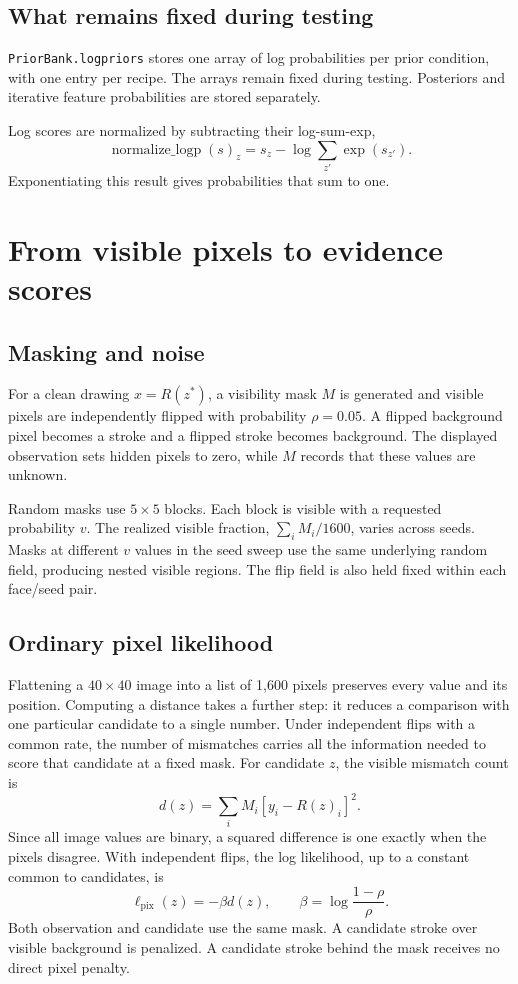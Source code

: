 \documentclass[11pt,letterpaper]{article}
\begin{document}
\subsection{What remains fixed during testing}
\texttt{PriorBank.logpriors} stores one array of log probabilities per prior condition, with one entry per recipe. The arrays remain fixed during testing. Posteriors and iterative feature probabilities are stored separately.

Log scores are normalized by subtracting their log-sum-exp,
\begin{equation}
\operatorname{normalize\_logp}(s)_z
=s_z-\log\sum_{z'}\exp(s_{z'}).
\end{equation}
Exponentiating this result gives probabilities that sum to one.

\section{From visible pixels to evidence scores}
\subsection{Masking and noise}
For a clean drawing $x=R(z^*)$, a visibility mask $M$ is generated and visible pixels are independently flipped with probability $\rho=0.05$. A flipped background pixel becomes a stroke and a flipped stroke becomes background. The displayed observation sets hidden pixels to zero, while $M$ records that these values are unknown.

Random masks use $5\times5$ blocks. Each block is visible with a requested probability $v$. The realized visible fraction, $\sum_iM_i/1600$, varies across seeds. Masks at different $v$ values in the seed sweep use the same underlying random field, producing nested visible regions. The flip field is also held fixed within each face/seed pair.

\subsection{Ordinary pixel likelihood}
Flattening a $40\times40$ image into a list of 1,600 pixels preserves every value and its position. Computing a distance takes a further step: it reduces a comparison with one particular candidate to a single number. Under independent flips with a common rate, the number of mismatches carries all the information needed to score that candidate at a fixed mask.
For candidate $z$, the visible mismatch count is
\begin{equation}
d(z)=\sum_i M_i[y_i-R(z)_i]^2.
\end{equation}
Since all image values are binary, a squared difference is one exactly when the pixels disagree. With independent flips, the log likelihood, up to a constant common to candidates, is
\begin{equation}
\ell_{\mathrm{pix}}(z)=-\beta d(z),\qquad
\beta=\log\frac{1-\rho}{\rho}.
\label{eq:pixel}
\end{equation}
Both observation and candidate use the same mask. A candidate stroke over visible background is penalized. A candidate stroke behind the mask receives no direct pixel penalty.
\end{document}

